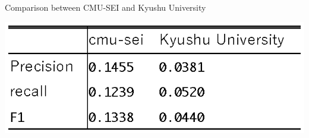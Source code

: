 \documentclass[JIP]{apris}
\begin{document}
\begin{table}[t]
 \centering
 \caption{Comparison between CMU-SEI and Kyushu University}
 \includegraphics[width=1.0\hsize]{image/cmu-kyu.eps} 
 \label{table2} 
\end{table}






\end{document}
